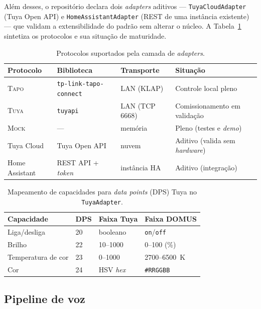 Além desses, o repositório declara dois \emph{adapters} aditivos ---
\texttt{TuyaCloudAdapter} (Tuya Open API) e \texttt{HomeAssistantAdapter} (REST
de uma instância existente) --- que validam a extensibilidade do padrão sem
alterar o núcleo. A Tabela~\ref{tab:adapters} sintetiza os protocolos e sua
situação de maturidade.

\begin{table}[H]
\centering
\caption{Protocolos suportados pela camada de \emph{adapters}.}
\label{tab:adapters}
\begin{tabular}{@{}llll@{}}
\toprule
\textbf{Protocolo} & \textbf{Biblioteca} & \textbf{Transporte} & \textbf{Situação} \\
\midrule
\textsc{Tapo}  & \texttt{tp-link-tapo-connect} & LAN (KLAP)      & Controle local pleno \\
\textsc{Tuya}  & \texttt{tuyapi}               & LAN (TCP 6668)  & Comissionamento em validação \\
\textsc{Mock}  & ---                           & memória         & Pleno (testes e \emph{demo}) \\
Tuya Cloud     & Tuya Open API                 & nuvem           & Aditivo (valida sem \emph{hardware}) \\
Home Assistant & REST API + \emph{token}       & instância HA    & Aditivo (integração) \\
\bottomrule
\end{tabular}
\end{table}

\begin{table}[H]
\centering
\caption{Mapeamento de capacidades para \emph{data points} (DPS) Tuya no \texttt{TuyaAdapter}.}
\label{tab:dps}
\begin{tabular}{@{}llll@{}}
\toprule
\textbf{Capacidade} & \textbf{DPS} & \textbf{Faixa Tuya} & \textbf{Faixa DOMUS} \\
\midrule
Liga/desliga      & 20 & booleano        & \texttt{on}/\texttt{off} \\
Brilho            & 22 & 10--1000        & 0--100 (\%) \\
Temperatura de cor& 23 & 0--1000         & 2700--6500~K \\
Cor               & 24 & HSV \emph{hex}  & \texttt{\#RRGGBB} \\
\bottomrule
\end{tabular}
\end{table}

\subsection{Pipeline de voz}

